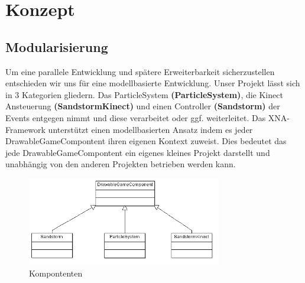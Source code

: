 \chapter{Konzept}
\begin{Spacing}{\mylinespace}

\section{Modularisierung}
Um eine parallele Entwicklung und spätere Erweiterbarkeit sicherzustellen entschieden wir uns für eine modellbasierte Entwicklung.
Unser Projekt lässt sich in 3 Kategorien gliedern. Das ParticleSystem \textbf{(ParticleSystem)}, die Kinect Ansteuerung \textbf{(SandstormKinect)} und einen Controller \textbf{(Sandstorm)} der Events entgegen nimmt und diese verarbeitet oder ggf. weiterleitet.
Das XNA-Framework unterstützt einen modellbasierten Ansatz indem es jeder DrawableGameCompontent ihren eigenen Kontext zuweist.
Dies bedeutet das jede DrawableGameCompontent ein eigenes kleines Projekt darstellt und unabhängig von den anderen Projekten betrieben werden kann.
\begin{figure}[h!]
	\centering
	\vspace*{20px}
	\includegraphics[width=320px]{graphics/DrawableGame.png}
	\caption{Kompontenten}
	\label{fig:singleColor}
\end{figure}


\end{Spacing}
\newpage
\clearpage
